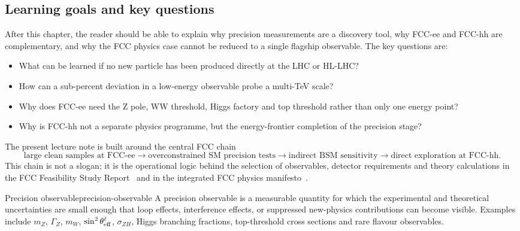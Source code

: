 \documentclass[11pt,a4paper]{article}
\newcommand{\mZ}{m_Z}
\newcommand{\gZ}{\Gamma_Z}
\newcommand{\mW}{m_W}
\newcommand{\sintw}{\sin^2\theta_{\rm eff}^{\ell}}
\numberwithin{equation}{section}
\begin{document}
\subsection{Learning goals and key questions}
After this chapter, the reader should be able to explain why precision measurements are a discovery tool, why FCC-ee and FCC-hh are complementary, and why the FCC physics case cannot be reduced to a single flagship observable. The key questions are:
\begin{itemize}[leftmargin=1.6em]
\item What can be learned if no new particle has been produced directly at the LHC or HL-LHC?
\item How can a sub-percent deviation in a low-energy observable probe a multi-TeV scale?
\item Why does FCC-ee need the Z pole, WW threshold, Higgs factory and top threshold rather than only one energy point?
\item Why is FCC-hh not a separate physics programme, but the energy-frontier completion of the precision stage?
\end{itemize}

The present lecture note is built around the central FCC chain
\begin{equation}
  \text{large clean samples at FCC-ee}
  \longrightarrow
  \text{overconstrained SM precision tests}
  \longrightarrow
  \text{indirect BSM sensitivity}
  \longrightarrow
  \text{direct exploration at FCC-hh} .
\end{equation}
This chain is not a slogan; it is the operational logic behind the selection of observables, detector requirements and theory calculations in the FCC Feasibility Study Report~\cite{FCCFSRVol1} and in the integrated FCC physics manifesto~\cite{FCCManifesto2025}.

\begin{definition}{Precision observable}{precision-observable}
A precision observable is a measurable quantity for which the experimental and theoretical uncertainties are small enough that loop effects, interference effects, or suppressed new-physics contributions can become visible. Examples include \(\mZ\), \(\gZ\), \(\mW\), \(\sintw\), \(\sigma_{ZH}\), Higgs branching fractions, top-threshold cross sections and rare flavour observables.
\end{definition}
\end{document}
